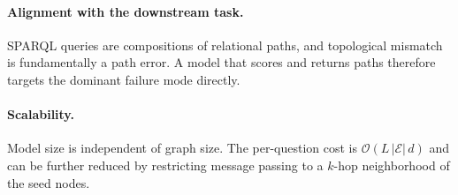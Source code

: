 \documentclass[11pt]{article}
\begin{document}
\paragraph{Alignment with the downstream task.}
SPARQL queries are compositions of relational paths, and topological mismatch is fundamentally a path error. A model that scores and returns paths therefore targets the dominant failure mode directly.

\paragraph{Scalability.}
Model size is independent of graph size. The per-question cost is $\mathcal{O}(L\,|\mathcal{E}|\,d)$ and can be further reduced by restricting message passing to a $k$-hop neighborhood of the seed nodes.



\end{document}
